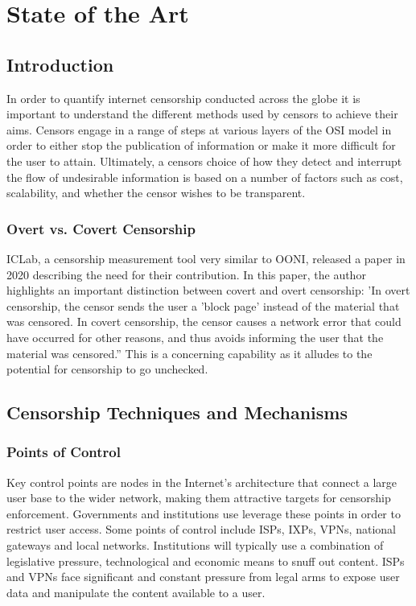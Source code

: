 \chapter{State of the Art}
\section{Introduction}

In order to quantify internet censorship conducted across the globe it is important to understand the different methods used by censors to achieve their aims. Censors engage in a range of steps at various layers of the OSI model in order to either stop the publication of information or make it more difficult for the user to attain. Ultimately, a censors choice of how they detect and interrupt the flow of undesirable information is based on a number of factors such as cost, scalability, and whether the censor wishes to be transparent.

\subsection{Overt vs. Covert Censorship }
ICLab, a censorship measurement tool very similar to OONI, released a paper in 2020 describing the need for their contribution. In this paper, the author highlights an important distinction between covert and overt censorship: 'In overt censorship, the censor sends the user a 'block page' instead of the material that was censored. In covert censorship, the censor causes a network error that could have occurred for other reasons, and thus avoids informing the user that the material was censored.” \cite{9152784} This is a concerning capability as it alludes to the potential for censorship to go unchecked. 









\section{Censorship Techniques and Mechanisms} 

\subsection{Points of Control}
Key control points are nodes in the Internet’s architecture that connect a large user base to the wider network, making them attractive targets for censorship enforcement. Governments and institutions use leverage these points in order to restrict user access. Some points of control include ISPs, IXPs, VPNs, national gateways and local networks. Institutions will typically use a combination of legislative pressure, technological and economic means to snuff out content. ISPs and VPNs face significant and constant pressure from legal arms to expose user data and manipulate the content available to a user.


